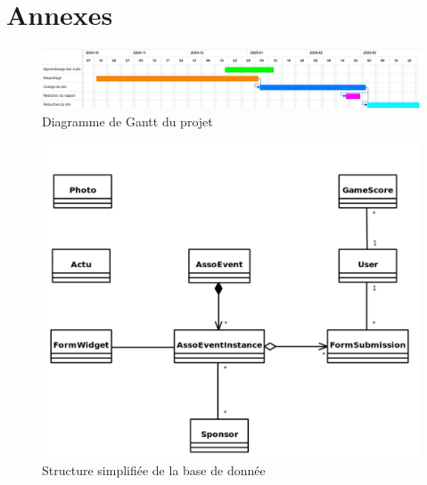 \appendix
\renewcommand{\thefigure}{\Alph{figure}}

\chapter*{Annexes}

\begin{figure}[H]
    \centering
    \includegraphics[width=\textwidth]{assets/pictures/gantt.png}
    \caption{Diagramme de Gantt du projet}
    \label{anx:gantt}
\end{figure}

\begin{figure}[H]
    \centering
    \includegraphics[width=\textwidth]{assets/pictures/database.png}
    \caption{Structure simplifiée de la base de donnée}
    \label{anx:gantt}
\end{figure}
